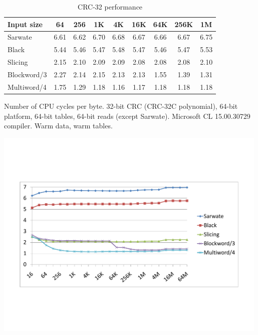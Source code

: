 \documentclass{article}
\begin{document}
\begin{table}
\begin{center}

\caption{CRC-32 performance} \label{t:CRC32Perf}
\begin{tabular}{| l | c | c | c | c | c | c | c | c |}
  \hline
Input size           & 64    & 256   & 1K    & 4K    & 16K   & 64K   & 256K  & 1M       \\
  \hline
             Sarwate &  6.61 &  6.62 &  6.70 &  6.68 &  6.67 &  6.66 &  6.67 &  6.75    \\
               Black &  5.44 &  5.46 &  5.47 &  5.48 &  5.47 &  5.46 &  5.47 &  5.53    \\
             Slicing &  2.15 &  2.10 &  2.09 &  2.09 &  2.08 &  2.08 &  2.08 &  2.10    \\
         Blockword/3 &  2.27 &  2.14 &  2.15 &  2.13 &  2.13 &  1.55 &  1.39 &  1.31    \\
         Multiword/4 &  1.75 &  1.29 &  1.18 &  1.16 &  1.17 &  1.18 &  1.18 &  1.18    \\
  \hline
\end{tabular}
\end{center}

Number of CPU cycles per byte. 32-bit CRC (CRC-32C polynomial), 64-bit
platform, 64-bit tables, 64-bit reads (except Sarwate). Microsoft CL
15.00.30729 compiler. Warm data, warm tables.

\begin{center}
\includegraphics[trim=14.25mm 50mm 16.75mm 50mm, width=0.99\textwidth]{CRC32-full.pdf} \label{f:CRC32Perf}
\end{center}


\end{table}
\end{document}
